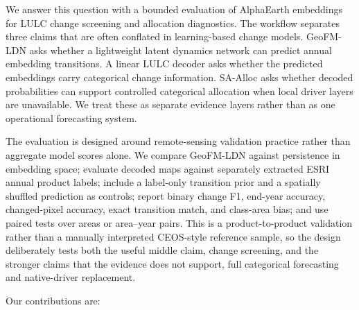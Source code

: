 \documentclass{article}
\begin{document}
We answer this question with a bounded evaluation of AlphaEarth embeddings for LULC change screening and allocation diagnostics. The workflow separates three claims that are often conflated in learning-based change models. GeoFM-LDN asks whether a lightweight latent dynamics network can predict annual embedding transitions. A linear LULC decoder asks whether the predicted embeddings carry categorical change information. SA-Alloc asks whether decoded probabilities can support controlled categorical allocation when local driver layers are unavailable. We treat these as separate evidence layers rather than as one operational forecasting system.

The evaluation is designed around remote-sensing validation practice rather than aggregate model scores alone. We compare GeoFM-LDN against persistence in embedding space; evaluate decoded maps against separately extracted ESRI annual product labels; include a label-only transition prior and a spatially shuffled prediction as controls; report binary change F1, end-year accuracy, changed-pixel accuracy, exact transition match, and class-area bias; and use paired tests over areas or area--year pairs. This is a product-to-product validation rather than a manually interpreted CEOS-style reference sample, so the design deliberately tests both the useful middle claim, change screening, and the stronger claims that the evidence does not support, full categorical forecasting and native-driver replacement.

Our contributions are:
\end{document}
